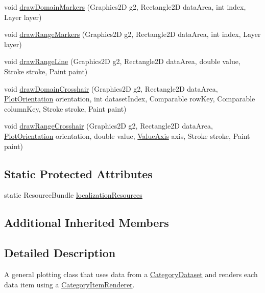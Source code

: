 \begin{DoxyCompactItemize}
\item 
void \mbox{\hyperlink{classorg_1_1jfree_1_1chart_1_1plot_1_1_category_plot_af585bf6fad134c483b15f2503a5ddcf0}{draw\+Domain\+Markers}} (Graphics2D g2, Rectangle2D data\+Area, int index, Layer layer)
\item 
void \mbox{\hyperlink{classorg_1_1jfree_1_1chart_1_1plot_1_1_category_plot_aefef87ddf5859a44984120f2350eab55}{draw\+Range\+Markers}} (Graphics2D g2, Rectangle2D data\+Area, int index, Layer layer)
\item 
void \mbox{\hyperlink{classorg_1_1jfree_1_1chart_1_1plot_1_1_category_plot_a999fca92d833d69b8ae767743a7c976c}{draw\+Range\+Line}} (Graphics2D g2, Rectangle2D data\+Area, double value, Stroke stroke, Paint paint)
\item 
void \mbox{\hyperlink{classorg_1_1jfree_1_1chart_1_1plot_1_1_category_plot_a9e7342df97fda2079c44104e69d6fc6b}{draw\+Domain\+Crosshair}} (Graphics2D g2, Rectangle2D data\+Area, \mbox{\hyperlink{classorg_1_1jfree_1_1chart_1_1plot_1_1_plot_orientation}{Plot\+Orientation}} orientation, int dataset\+Index, Comparable row\+Key, Comparable column\+Key, Stroke stroke, Paint paint)
\item 
void \mbox{\hyperlink{classorg_1_1jfree_1_1chart_1_1plot_1_1_category_plot_a8aef2b0c985d6c5735520dd25811b8c7}{draw\+Range\+Crosshair}} (Graphics2D g2, Rectangle2D data\+Area, \mbox{\hyperlink{classorg_1_1jfree_1_1chart_1_1plot_1_1_plot_orientation}{Plot\+Orientation}} orientation, double value, \mbox{\hyperlink{classorg_1_1jfree_1_1chart_1_1axis_1_1_value_axis}{Value\+Axis}} axis, Stroke stroke, Paint paint)
\end{DoxyCompactItemize}
\subsection*{Static Protected Attributes}
\begin{DoxyCompactItemize}
\item 
static Resource\+Bundle \mbox{\hyperlink{classorg_1_1jfree_1_1chart_1_1plot_1_1_category_plot_a79198b9d3f1e0d2d93a3604797efc680}{localization\+Resources}}
\end{DoxyCompactItemize}
\subsection*{Additional Inherited Members}


\subsection{Detailed Description}
A general plotting class that uses data from a \mbox{\hyperlink{}{Category\+Dataset}} and renders each data item using a \mbox{\hyperlink{}{Category\+Item\+Renderer}}. 

